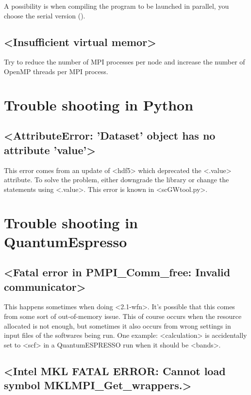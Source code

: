 \documentclass[hyperref, a4paper, 12pt]{report}
\def\texttt#1{<#1>}%
\newcommand{\shortcode}[1]{\texttt{#1}}
\begin{document}
A possibility is when compiling the program to be launched in parallel,
you choose the serial version ().

\subsection{\shortcode{Insufficient virtual memor}}

Try to reduce the number of MPI processes per node 
and increase the number of OpenMP threads per MPI process.


\section{Trouble shooting in Python}

\subsection{\shortcode{AttributeError: 'Dataset' object has no attribute 'value'}}

This error comes from an update of \shortcode{hdf5} 
which deprecated the \shortcode{.value} attribute.
To solve the problem, 
either downgrade the library 
or change the statements using \shortcode{.value}.
This error is known in \shortcode{scGWtool.py}.

\section{Trouble shooting in QuantumEspresso}

\subsection{\shortcode{Fatal error in PMPI_Comm_free: Invalid communicator}}

This happens sometimes when doing \shortcode{2.1-wfn}.
It's possible that this comes from some sort of out-of-memory issue.
This of course occurs when the resource allocated is not enough,
but sometimes it also occurs from wrong settings in input files of the softwares being run.
One example: \shortcode{calculation} is accidentally set to \shortcode{scf} 
in a QuantumESPRESSO run when it should be \shortcode{bands}.

\subsection{\shortcode{Intel MKL FATAL ERROR: Cannot load symbol MKLMPI_Get_wrappers.}}
\end{document}
